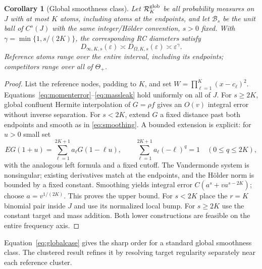 \documentclass[10pt]{amsart}
\newtheorem{corollary}[theorem]{Corollary}
\theoremstyle{definition}
\theoremstyle{remark}
\newcommand{\eps}{\varepsilon}
\newcommand{\ThetaAll}{\Theta_+}
\begin{document}
\begin{corollary}[Global smoothness class]\label{cor:global}
Let $\mathcal R_K^{\rm glob}$ be all probability measures on $J$ with at most $K$ atoms, including atoms at the endpoints, and let $\mathcal B_s$ be the unit ball of $C^s(J)$ with the same integer/H\"older convention, $s>0$ fixed. With $\gamma=\min\{1,s/(2K)\}$, the corresponding RC diameters satisfy
\begin{equation}\label{eq:globalcase}
 D_{\infty,K,s}(\eps)\asymp D_{\Omega,K,s}(\eps)\asymp\eps^\gamma.
\end{equation}
Reference atoms range over the entire interval, including its endpoints; competitors range over all of $\ThetaAll$.
\end{corollary}
\begin{proof}
List the reference nodes, padding to $K$, and set $W=\prod_{\ell=1}^K(x-c_\ell)^2$. Equations~\eqref{eq:momenterror}--\eqref{eq:massleak} hold uniformly on all of $J$. For $s\ge2K$, global confluent Hermite interpolation of $G=\rho f$ gives an $O(v)$ integral error without inverse separation. For $s<2K$, extend $G$ a fixed distance past both endpoints and smooth as in \eqref{eq:smoothing}. A bounded extension is explicit: for $u>0$ small set
\[
 EG(1+u)=\sum_{\ell=1}^{2K+1}a_\ell G(1-\ell u),\qquad
 \sum_{\ell=1}^{2K+1}a_\ell(-\ell)^q=1\quad(0\le q\le2K),
\]
with the analogous left formula and a fixed cutoff. The Vandermonde system is nonsingular; existing derivatives match at the endpoints, and the H\"older norm is bounded by a fixed constant. Smoothing yields integral error $C(a^s+va^{s-2K})$; choose $a=v^{1/(2K)}$. This proves the upper bound. For $s<2K$ place the $r=K$ binomial pair inside $J$ and use its normalized local bump. For $s\ge2K$ use the constant target and mass addition. Both lower constructions are feasible on the entire frequency axis.
\end{proof}
Equation~\eqref{eq:globalcase} gives the sharp order for a standard global smoothness class. The clustered result refines it by resolving target regularity separately near each reference cluster.
\end{document}
